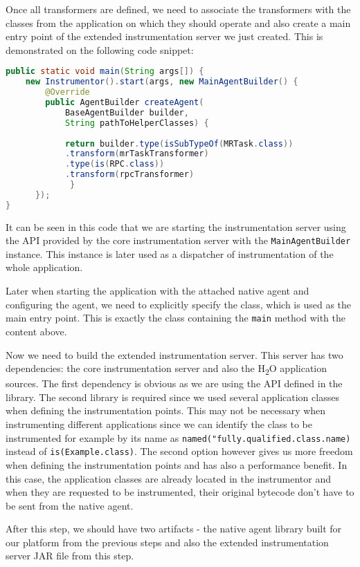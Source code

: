 Once all transformers are defined, we need to associate the transformers with the classes from the application on which they should operate and also create a main entry point of the extended instrumentation server we just created. This is demonstrated on the following code snippet:

\begin{lstlisting}[language=Java]
 public static void main(String args[]) {
	new Instrumentor().start(args, new MainAgentBuilder() {
		@Override
		public AgentBuilder createAgent(
			BaseAgentBuilder builder,
			String pathToHelperClasses) {
	 		 
			return builder.type(isSubTypeOf(MRTask.class))
			.transform(mrTaskTransformer)
			.type(is(RPC.class))
			.transform(rpcTransformer)
	         }
	  });
}			 
\end{lstlisting}
It can be seen in this code that we are starting the instrumentation server using the API provided by the core instrumentation server with the \texttt{MainAgentBuilder} instance. This instance is later used as a dispatcher of instrumentation of the whole application.

Later when starting the application with the attached native agent and configuring the agent, we need to explicitly specify the class, which is used as the main entry point. This is exactly the class containing the \texttt{main} method with the content above.

Now we need to build the extended instrumentation server. This server has two dependencies: the core instrumentation server and also the H\textsubscript{2}O application sources. The first dependency is obvious as we are using the API defined in the library. The second library is required since we used several application classes when defining the instrumentation points. This may not be necessary when instrumenting different applications since we can identify the class to be instrumented for example by its name as \texttt{named("fully.qualified.class.name)} instead of \texttt{is(Example.class)}. The second option however gives us more freedom when defining the instrumentation points and has also a performance benefit. In this case, the application classes are already located in the instrumentor and when they are requested to be instrumented, their original bytecode don't have to be sent from the native agent. 

After this step, we should have two artifacts - the native agent library built for our platform from the previous steps and also the extended instrumentation server JAR file from this step.
